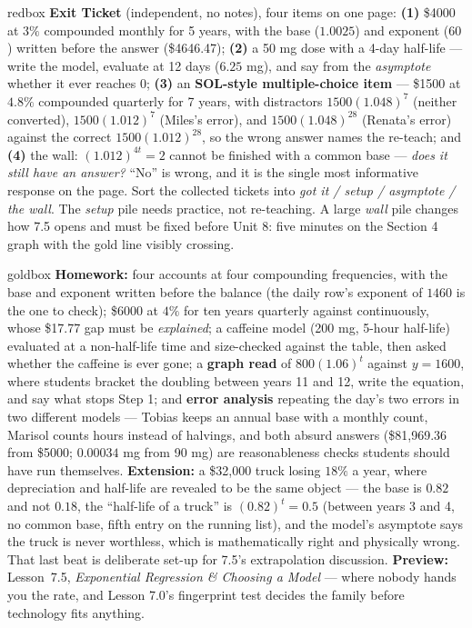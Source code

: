 \documentclass[10pt]{article}
\begin{document}
\begin{skillbox}{redbox}
\textbf{Exit Ticket} (independent, no notes), four items on one page: \textbf{(1)} \$4000 at $3\%$
compounded monthly for 5 years, with the base ($1.0025$) and exponent ($60$) written before the answer
(\$4646.47); \textbf{(2)} a 50 mg dose with a 4-day half-life --- write the model, evaluate at 12 days
($6.25$ mg), and say from the \emph{asymptote} whether it ever reaches $0$; \textbf{(3)} an
\textbf{SOL-style multiple-choice item} --- \$1500 at $4.8\%$ compounded quarterly for 7 years, with
distractors $1500(1.048)^{7}$ (neither converted), $1500(1.012)^{7}$ (Miles's error), and
$1500(1.048)^{28}$ (Renata's error) against the correct $1500(1.012)^{28}$, so the wrong answer names
the re-teach; and \textbf{(4)} the wall: $(1.012)^{4t}=2$ cannot be finished with a common base ---
\emph{does it still have an answer?} ``No'' is wrong, and it is the single most informative response on
the page. Sort the collected tickets into \emph{got it / setup / asymptote / the wall}. The
\emph{setup} pile needs practice, not re-teaching. A large \emph{wall} pile changes how 7.5 opens and
must be fixed before Unit 8: five minutes on the Section 4 graph with the gold line visibly crossing.
\end{skillbox}

\begin{skillbox}{goldbox}
\textbf{Homework:} four accounts at four compounding frequencies, with the base and exponent written
before the balance (the daily row's exponent of $1460$ is the one to check); \$6000 at $4\%$ for ten
years quarterly against continuously, whose \$17.77 gap must be \emph{explained}; a caffeine model
(200 mg, 5-hour half-life) evaluated at a non-half-life time and size-checked against the table, then
asked whether the caffeine is ever gone; a \textbf{graph read} of $800(1.06)^{t}$ against $y=1600$,
where students bracket the doubling between years 11 and 12, write the equation, and say what stops
Step 1; and \textbf{error analysis} repeating the day's two errors in two different models --- Tobias
keeps an annual base with a monthly count, Marisol counts hours instead of halvings, and both absurd
answers (\$81{,}969.36 from \$5000; $0.00034$ mg from 90 mg) are reasonableness checks students should
have run themselves. \textbf{Extension:} a \$32{,}000 truck losing $18\%$ a year, where depreciation and
half-life are revealed to be the same object --- the base is $0.82$ and not $0.18$, the ``half-life of a
truck'' is $(0.82)^{t}=0.5$ (between years 3 and 4, no common base, fifth entry on the running list),
and the model's asymptote says the truck is never worthless, which is mathematically right and
physically wrong. That last beat is deliberate set-up for 7.5's extrapolation discussion.
\textbf{Preview:} Lesson~7.5, \emph{Exponential Regression \& Choosing a Model} --- where nobody hands
you the rate, and Lesson 7.0's fingerprint test decides the family before technology fits anything.
\end{skillbox}
\end{document}
